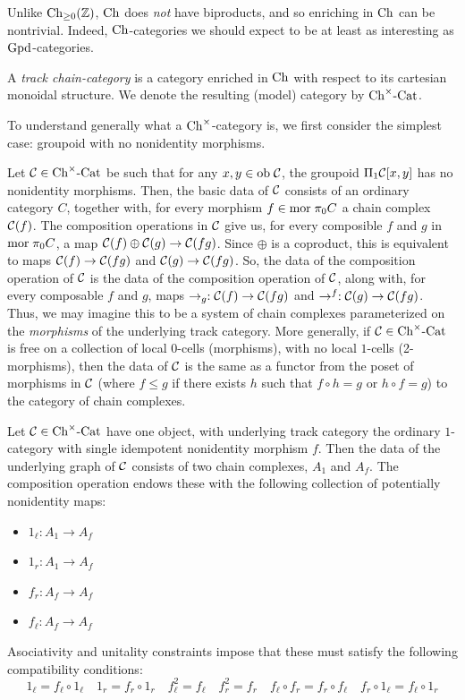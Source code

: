 \documentclass[12pt]{amsart}
\begin{document}
Unlike $\mathrm{Ch}_{\ge 0}(\mathbb{Z})$, ${\mathrm{Ch}}$ does \textit{not} have biproducts, and so enriching in ${\mathrm{Ch}}$ can be nontrivial. Indeed, ${\mathrm{Ch}}$-categories we should expect to be at least as interesting as $\mathrm{Gpd}$-categories. 
\begin{definition}
	A \emph{track chain-category} is a category enriched in ${\mathrm{Ch}}$ with respect to its cartesian monoidal structure. We denote the resulting (model) category by ${{{\mathrm{Ch}}}^{\times}\text{-}\mathrm{Cat}}$.
\end{definition}
To understand generally what a ${\mathrm{Ch}}^\times$-category is, we first consider the simplest case: groupoid with no nonidentity morphisms. 
\par
Let $\mathcal{C} \in {{{\mathrm{Ch}}}^{\times}\text{-}\mathrm{Cat}}$ be such that for any $x,y \in {\mathrm{ob}\;} \mathcal{C}$, the groupoid $\Pi_1 \mathcal{C}[x,y]$ has no nonidentity morphisms. 
Then, the basic data of $\mathcal{C}$ consists of an ordinary category $C$, together with, for every morphism $f \in {\mathrm{mor}\;} \pi_0C$ a chain complex $\mathcal{C}(f)$. 
The composition operations in $\mathcal{C}$ give us, for every composible $f$ and $g$ in ${\mathrm{mor}\;} \pi_0C$, a map $\mathcal{C}(f) \oplus \mathcal{C}(g) \to \mathcal{C}(f g)$. 
Since $\oplus$ is a coproduct, this is equivalent to maps $\mathcal{C}(f) \to \mathcal{C}(f g)$ and $\mathcal{C}(g) \to \mathcal{C}(fg)$. 
So, the data of the composition operation of $\mathcal{C}$ is the data of the composition operation of $\mathcal{C}$, along with, for every composable $f$ and $g$, maps $\rightarrow_g: \mathcal{C}(f) \to \mathcal{C}(fg)$ and $\rightarrow^f: \mathcal{C}(g) \to \mathcal{C}(fg)$.
Thus, we may imagine this to be a system of chain complexes parameterized on the \textit{morphisms} of the underlying track category.
More generally, if $\mathcal{C} \in {{{\mathrm{Ch}}}^{\times}\text{-}\mathrm{Cat}}$ is free on a collection of local $0$-cells (morphisms), with no local $1$-cells (2-morphisms), then the data of $\mathcal{C}$ is the same as a functor from the poset of morphisms in $\mathcal{C}$ (where $f \le g$ if there exists $h$ such that $f \circ h = g$ or $h \circ f = g$) to the category of chain complexes.
\begin{example}
	Let $\mathcal{C} \in {{{\mathrm{Ch}}}^{\times}\text{-}\mathrm{Cat}}$ have one object, with underlying track category the ordinary $1$-category with single  idempotent nonidentity morphism $f$.
	Then the data of the underlying graph of $\mathcal{C}$ consists of two chain complexes, $A_1$ and $A_f$. 
The composition operation endows these with the following collection of potentially nonidentity maps:
	\begin{itemize}
		\item $1_\ell: A_1 \to A_f$
		\item $1_r: A_1 \to A_f$
		\item $f_r: A_f \to A_f $
		\item $f_\ell: A_f \to A_f$
	\end{itemize}
	Asociativity and unitality constraints impose that these must satisfy the following compatibility conditions:
	$$1_\ell = f_\ell \circ 1_\ell \quad 1_r = f_r \circ 1_r \quad f_\ell^2 = f_\ell \quad f_r^2 = f_r \quad f_\ell \circ f_r = f_r \circ f_\ell \quad f_r \circ 1_\ell = f_\ell \circ 1_r$$
\end{example}
\end{document}

